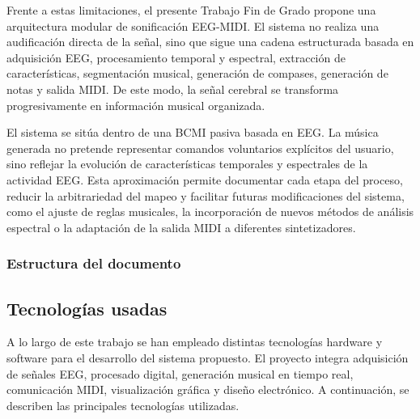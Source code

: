 \documentclass[../main.tex]{subfiles}
\begin{document}
Frente a estas limitaciones, el presente Trabajo Fin de Grado propone una arquitectura modular de sonificación EEG-MIDI. El sistema no realiza una audificación directa de la señal, sino que sigue una cadena estructurada basada en adquisición EEG, procesamiento temporal y espectral, extracción de características, segmentación musical, generación de compases, generación de notas y salida MIDI. De este modo, la señal cerebral se transforma progresivamente en información musical organizada.

El sistema se sitúa dentro de una BCMI pasiva basada en EEG. La música generada no pretende representar comandos voluntarios explícitos del usuario, sino reflejar la evolución de características temporales y espectrales de la actividad EEG. Esta aproximación permite documentar cada etapa del proceso, reducir la arbitrariedad del mapeo y facilitar futuras modificaciones del sistema, como el ajuste de reglas musicales, la incorporación de nuevos métodos de análisis espectral o la adaptación de la salida MIDI a diferentes sintetizadores.

\subsubsection{Estructura del documento}

\subsection{Tecnologías usadas}

A lo largo de este trabajo se han empleado distintas tecnologías hardware y software para el desarrollo del sistema propuesto. El proyecto integra adquisición de señales EEG, procesado digital, generación musical en tiempo real, comunicación MIDI, visualización gráfica y diseño electrónico. A continuación, se describen las principales tecnologías utilizadas.
\end{document}
